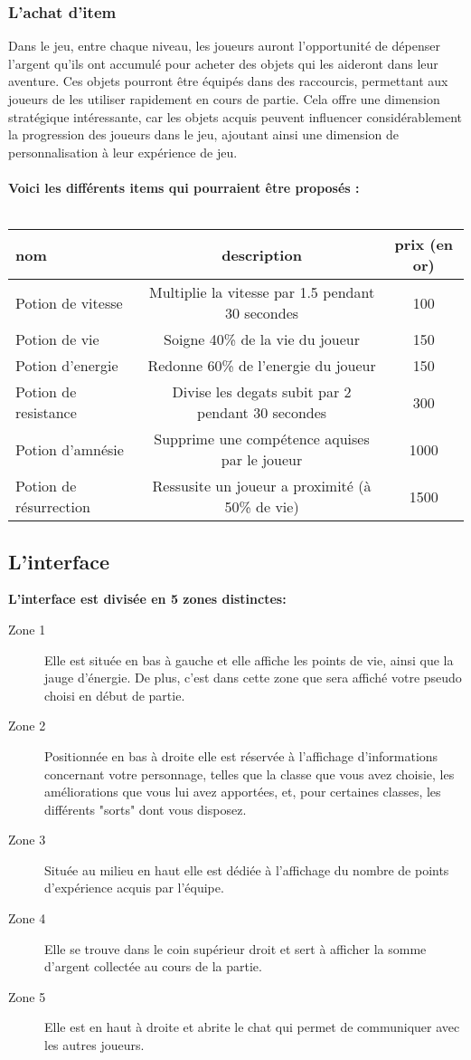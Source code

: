 \documentclass{article}
\begin{document}
\subsubsection{L'achat d'item}
Dans le jeu, entre chaque niveau, les joueurs auront l'opportunité de dépenser l'argent qu'ils ont accumulé pour acheter des objets qui les aideront dans leur aventure. Ces objets pourront être équipés dans des raccourcis, permettant aux joueurs de les utiliser rapidement en cours de partie. Cela offre une dimension stratégique intéressante, car les objets acquis peuvent influencer considérablement la progression des joueurs dans le jeu, ajoutant ainsi une dimension de personnalisation à leur expérience de jeu.\\ \\
\textbf{Voici les différents items qui pourraient être proposés :}\\ \\
\begin{tabular}{ | l | c | c | }
 \hline			
   \textbf{nom} & \textbf{description} & \textbf{prix (en or)} \\ \hline \hline
    Potion de vitesse & Multiplie la vitesse par 1.5 pendant 30 secondes & 100 \\ \hline
    Potion de vie & Soigne 40\% de la vie du joueur  & 150 \\ \hline 
    Potion d'energie & Redonne 60\% de l'energie du joueur & 150 \\ \hline
    Potion de resistance & Divise les degats subit par 2 pendant 30 secondes & 300 \\ \hline
    Potion d'amnésie & Supprime une compétence aquises par le joueur & 1000 \\ \hline
    Potion de résurrection & Ressusite un joueur a proximité (à 50\% de vie) & 1500 \\ \hline
\end{tabular}

\subsection{L'interface}
\textbf{L'interface est divisée en 5 zones distinctes:}
\begin{description}
\item[Zone 1] Elle est située en bas à gauche et elle affiche les points de vie, ainsi que la jauge d'énergie. De plus, c'est dans cette zone que sera affiché votre pseudo choisi en début de partie.
\item[Zone 2] Positionnée en bas à droite elle est réservée à l'affichage d'informations concernant votre personnage, telles que la classe que vous avez choisie, les améliorations que vous lui avez apportées, et, pour certaines classes, les différents "sorts" dont vous disposez.
\item[Zone 3] Située au milieu en haut elle est dédiée à l'affichage du nombre de points d'expérience acquis par l'équipe. 
\item[Zone 4] Elle se trouve dans le coin supérieur droit et sert à afficher la somme d'argent collectée au cours de la partie.
\item[Zone 5] Elle est en haut à droite et abrite le chat qui permet de communiquer avec les autres joueurs.
\end{description}
\end{document}
